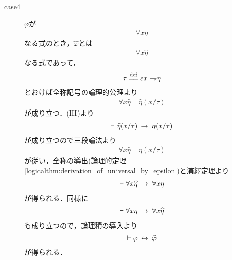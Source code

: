 \begin{sketch}
\begin{description}
\begin{description}
				\item[case4] $\varphi$が
					\begin{align}
						\forall x \eta
					\end{align}
					なる式のとき，$\widehat{\varphi}$とは
					\begin{align}
						\forall x \widehat{\eta}
					\end{align}
					なる式であって，
					\begin{align}
						\tau \defeq \varepsilon x \negation \eta
					\end{align}
					とおけば全称記号の論理的公理より
					\begin{align}
						\forall x \widehat{\eta} \vdash \widehat{\eta}(x/\tau)
					\end{align}
					が成り立つ．(IH)より
					\begin{align}
						\vdash \widehat{\eta}(x/\tau) \hspace{0.25em}\rightarrow\hspace{0.25em} \eta(x/\tau)
					\end{align}
					が成り立つので三段論法より
					\begin{align}
						\forall x \widehat{\eta} \vdash \eta(x/\tau)
					\end{align}
					が従い，全称の導出(論理的定理\ref{logicalthm:derivation_of_universal_by_epsilon})と演繹定理より
					\begin{align}
						\vdash \forall x \widehat{\eta} \hspace{0.25em}\rightarrow\hspace{0.25em} \forall x \eta
					\end{align}
					が得られる．同様に
					\begin{align}
						\vdash \forall x \eta \hspace{0.25em}\rightarrow\hspace{0.25em} \forall x \widehat{\eta}
					\end{align}
					も成り立つので，論理積の導入より
					\begin{align}
						\vdash \varphi \hspace{0.25em}\leftrightarrow\hspace{0.25em} \widehat{\varphi}
					\end{align}
					が得られる．
					\QED
			\end{description}
		\end{description}
	\end{sketch}